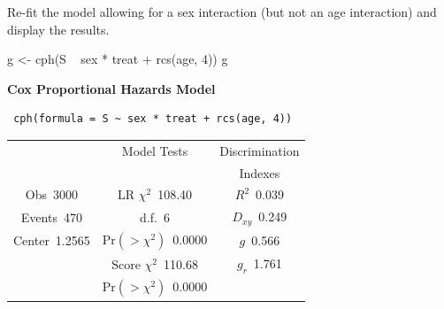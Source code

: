 Re-fit the model allowing for a sex interaction (but not an age interaction) and display the results.
\begin{Sinput}
g <- cph(S ~ sex * treat + rcs(age, 4))
g
\end{Sinput}

 \noindent \textbf{Cox Proportional Hazards Model}
 
 \begin{verbatim}
 cph(formula = S ~ sex * treat + rcs(age, 4))
 \end{verbatim}
 
 {\selectfont \begin{center}\begin{tabular}{|c|c|c|}\hline
&Model Tests&Discrimination\\
&&Indexes\\\hline
Obs~\hfill 3000&LR $\chi^{2}$~\hfill 108.40&$R^{2}$~\hfill 0.039\\
Events~\hfill 470&d.f.~\hfill 6&$D_{xy}$~\hfill 0.249\\
Center~\hfill 1.2565&Pr$(>\chi^{2})$~\hfill 0.0000&$g$~\hfill 0.566\\
&Score $\chi^{2}$~\hfill 110.68&$g_{r}$~\hfill 1.761\\
&Pr$(>\chi^{2})$~\hfill 0.0000&\\
\hline
\end{tabular}
\end{center}}
 
